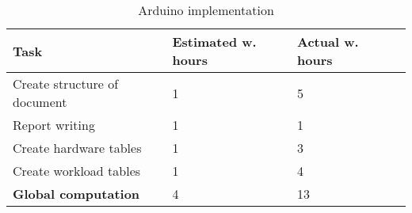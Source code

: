 \begin{table}[H]
\caption{Arduino implementation}
\begin{tabular}{llll}
\hline
                               \textbf{Task}    & \textbf{Estimated w. hours} & \textbf{Actual w. hours} \\ \hline
\rowcolor{lightgray}
Create structure of document                    & 1                           & 5                      \\
Report writing                                  & 1                           & 1                      \\
\rowcolor{lightgray}
Create hardware tables                          & 1                           & 3                     \\
Create workload tables                          & 1                           & 4                      \\
\rowcolor{lightgray}
\textbf{Global computation}                     & 4                          & 13                     \\
\end{tabular}
\end{table}

